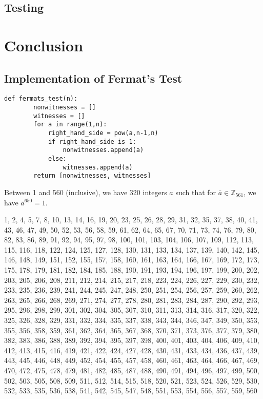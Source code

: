 \documentclass[12pt, titlepage]{amsart}
\newcommand\Z{{\mathbb Z}}
\theoremstyle{definition}
\begin{document}
	\subsection{Testing}
	

		
	\section{Conclusion}\label{conclusions}
	
	\clearpage
	
	
	\begin{appendix}
	\section{Implementation of Fermat's Test}
	
	\begin{lstlisting}[frame=single]
	def fermats_test(n):
		nonwitnesses = []
		witnesses = []
		for a in range(1,n):
			right_hand_side = pow(a,n-1,n)
			if right_hand_side is 1:
				nonwitnesses.append(a)
			else:
				witnesses.append(a)
		return [nonwitnesses, witnesses]
	\end{lstlisting}
	
	Between 1 and 560 (inclusive), we have 320 integers $a$ such that for $\bar{a} \in \Z_{561}$, we have $\bar{a}^{650} = \bar{1}$.
	
	\begin{seqsplit}
	1, 2, 4, 5, 7, 8, 10, 13, 14, 16, 19, 20, 23, 25, 26, 28, 29, 31, 32, 35, 37, 38, 40, 41, 43, 46, 47, 49, 50, 52, 53, 56, 58, 59, 61, 62, 64, 65, 67, 70, 71, 73, 74, 76, 79, 80, 82, 83, 86, 89, 91, 92, 94, 95, 97, 98, 100, 101, 103, 104, 106, 107, 109, 112, 113, 115, 116, 118, 122, 124, 125, 127, 128, 130, 131, 133, 134, 137, 139, 140, 142, 145, 146, 148, 149, 151, 152, 155, 157, 158, 160, 161, 163, 164, 166, 167, 169, 172, 173, 175, 178, 179, 181, 182, 184, 185, 188, 190, 191, 193, 194, 196, 197, 199, 200, 202, 203, 205, 206, 208, 211, 212, 214, 215, 217, 218, 223, 224, 226, 227, 229, 230, 232, 233, 235, 236, 239, 241, 244, 245, 247, 248, 250, 251, 254, 256, 257, 259, 260, 262, 263, 265, 266, 268, 269, 271, 274, 277, 278, 280, 281, 283, 284, 287, 290, 292, 293, 295, 296, 298, 299, 301, 302, 304, 305, 307, 310, 311, 313, 314, 316, 317, 320, 322, 325, 326, 328, 329, 331, 332, 334, 335, 337, 338, 343, 344, 346, 347, 349, 350, 353, 355, 356, 358, 359, 361, 362, 364, 365, 367, 368, 370, 371, 373, 376, 377, 379, 380, 382, 383, 386, 388, 389, 392, 394, 395, 397, 398, 400, 401, 403, 404, 406, 409, 410, 412, 413, 415, 416, 419, 421, 422, 424, 427, 428, 430, 431, 433, 434, 436, 437, 439, 443, 445, 446, 448, 449, 452, 454, 455, 457, 458, 460, 461, 463, 464, 466, 467, 469, 470, 472, 475, 478, 479, 481, 482, 485, 487, 488, 490, 491, 494, 496, 497, 499, 500, 502, 503, 505, 508, 509, 511, 512, 514, 515, 518, 520, 521, 523, 524, 526, 529, 530, 532, 533, 535, 536, 538, 541, 542, 545, 547, 548, 551, 553, 554, 556, 557, 559, 560
	\end{seqsplit}
		

\end{appendix}
\end{document}
